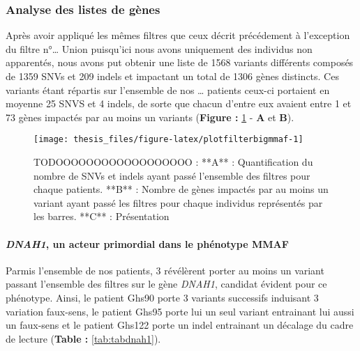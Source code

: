 \documentclass[12pt,twoside]{reedthesis}
\theoremstyle{definition}
\theoremstyle{definition}
\theoremstyle{remark}
\begin{document}
  \newpage
  
  \subsubsection{Analyse des listes de
  gènes}\label{analyse-des-listes-de-genes}
  
  Après avoir appliqué les mêmes filtres que ceux décrit précédement à
  l'exception du filtre n°\ldots{} Union puisqu'ici nous avons uniquement
  des individus non apparentés, nous avons put obtenir une liste de 1568
  variants différents composés de 1359 SNVs et 209 indels et impactant un
  total de 1306 gènes distincts. Ces variants étant répartis sur
  l'ensemble de nos \ldots{} patients ceux-ci portaient en moyenne 25 SNVS
  et 4 indels, de sorte que chacun d'entre eux avaient entre 1 et 73 gènes
  impactés par au moins un variants (\textbf{Figure :
  }\ref{fig:plotfilterbigmmaf} - \textbf{A} et \textbf{B}).
  
  \begin{figure}
  
  {\centering \texttt{[image: thesis\_files/figure-latex/plotfilterbigmmaf-1]} 
  
  }
  
  \caption[TODOOOOOOOOOOOOOOOOOO]{TODOOOOOOOOOOOOOOOOOO : **A** : Quantification du nombre de SNVs et indels ayant passé l'ensemble des filtres pour chaque patients. **B** : Nombre de gènes impactés par au moins un variant ayant passé les filtres pour chaque individus représentés par les barres. **C** : Présentation }\label{fig:plotfilterbigmmaf}
  \end{figure}
  
  \newpage
  
  \paragraph{\texorpdfstring{\emph{DNAH1}, un acteur primordial dans le
  phénotype
  MMAF}{DNAH1, un acteur primordial dans le phénotype MMAF}}\label{dnah1-un-acteur-primordial-dans-le-phenotype-mmaf}
  
  Parmis l'ensemble de nos patients, 3 révélèrent porter au moins un
  variant passant l'ensemble des filtres sur le gène \emph{DNAH1},
  candidat évident pour ce phénotype. Ainsi, le patient Ghs90 porte 3
  variants successifs induisant 3 variation faux-sens, le patient Ghs95
  porte lui un seul variant entrainant lui aussi un faux-sens et le
  patient Ghs122 porte un indel entrainant un décalage du cadre de lecture
  (\textbf{Table : }\ref{tab:tabdnah1}).
  
\end{document}
